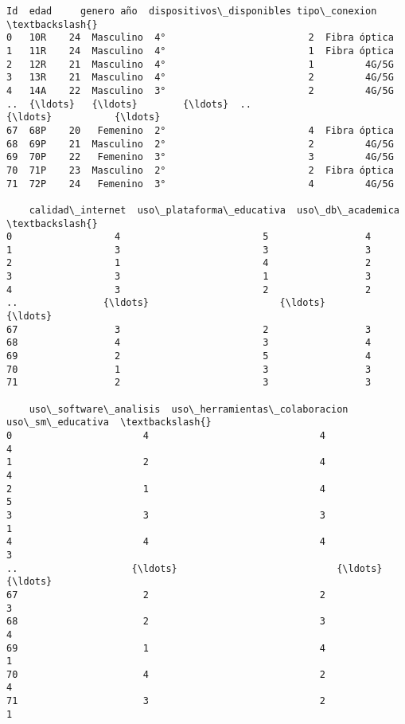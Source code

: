 \documentclass[11pt]{article}
\makeatletter
\newcommand{\boxspacing}{\kern\kvtcb@left@rule\kern\kvtcb@boxsep}
\newcommand{\prompt}[4]{
        {\ttfamily\llap{{\color{#2}[#3]:\hspace{3pt}#4}}\vspace{-\baselineskip}}
    }
\makeatother
\begin{document}
            \begin{tcolorbox}[breakable, size=fbox, boxrule=.5pt, pad at break*=1mm, opacityfill=0]
\prompt{Out}{outcolor}{19}{\boxspacing}
\begin{Verbatim}[commandchars=\\\{\}]
     Id  edad     genero año  dispositivos\_disponibles tipo\_conexion  \textbackslash{}
0   10R    24  Masculino  4°                         2  Fibra óptica
1   11R    24  Masculino  4°                         1  Fibra óptica
2   12R    21  Masculino  4°                         1         4G/5G
3   13R    21  Masculino  4°                         2         4G/5G
4   14A    22  Masculino  3°                         2         4G/5G
..  {\ldots}   {\ldots}        {\ldots}  ..                       {\ldots}           {\ldots}
67  68P    20   Femenino  2°                         4  Fibra óptica
68  69P    21  Masculino  2°                         2         4G/5G
69  70P    22   Femenino  3°                         3         4G/5G
70  71P    23  Masculino  2°                         2  Fibra óptica
71  72P    24   Femenino  3°                         4         4G/5G

    calidad\_internet  uso\_plataforma\_educativa  uso\_db\_academica  \textbackslash{}
0                  4                         5                 4
1                  3                         3                 3
2                  1                         4                 2
3                  3                         1                 3
4                  3                         2                 2
..               {\ldots}                       {\ldots}               {\ldots}
67                 3                         2                 3
68                 4                         3                 4
69                 2                         5                 4
70                 1                         3                 3
71                 2                         3                 3

    uso\_software\_analisis  uso\_herramientas\_colaboracion  uso\_sm\_educativa  \textbackslash{}
0                       4                              4                 4
1                       2                              4                 4
2                       1                              4                 5
3                       3                              3                 1
4                       4                              4                 3
..                    {\ldots}                            {\ldots}               {\ldots}
67                      2                              2                 3
68                      2                              3                 4
69                      1                              4                 1
70                      4                              2                 4
71                      3                              2                 1


\end{Verbatim}
\end{tcolorbox}
\end{document}
